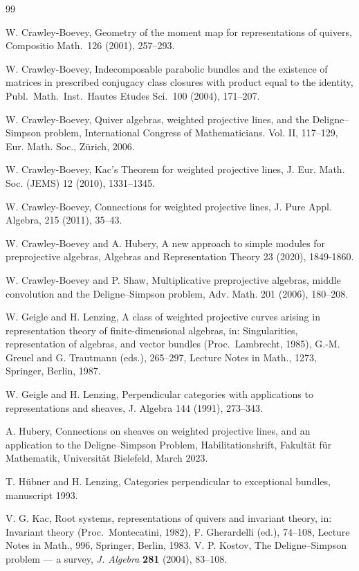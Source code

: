 \documentclass[12pt,a4paper]{amsart}
\theoremstyle{plain}
\begin{document}
\frenchspacing
\begin{thebibliography}{99}

W. Crawley-Boevey,
Geometry of the moment map for representations of quivers,
Compositio Math.\ 126 (2001), 257--293.

W. Crawley-Boevey,
Indecomposable parabolic bundles and the existence of matrices in
prescribed conjugacy class closures with product equal to the identity,
Publ.\ Math.\ Inst.\ Hautes Etudes Sci.\ 100 (2004), 171--207.

W. Crawley-Boevey,
Quiver algebras, weighted projective lines, and the Deligne--Simpson problem,
International Congress of Mathematicians. Vol. II, 
117--129, Eur. Math. Soc., Z\"{u}rich, 2006. 

W. Crawley-Boevey,
Kac's Theorem for weighted projective lines,
J. Eur. Math. Soc. (JEMS) 12 (2010), 1331--1345. 

W. Crawley-Boevey,
Connections for weighted projective lines,
J. Pure Appl. Algebra, 215 (2011), 35--43. 

W. Crawley-Boevey and A. Hubery, 
A new approach to simple modules for preprojective algebras, 
Algebras and Representation Theory 23 (2020), 1849-1860.

W. Crawley-Boevey and P. Shaw,
Multiplicative preprojective algebras, middle convolution and the Deligne--Simpson problem,
Adv. Math. 201 (2006), 180--208. 

W. Geigle and H. Lenzing,
A class of weighted projective curves arising in representation
theory of finite-dimensional algebras,
in:
Singularities, representation of algebras, and vector bundles
(Proc.\ Lambrecht, 1985),
G.-M. Greuel and G. Trautmann (eds.),
265--297, Lecture Notes in Math., 1273,
Springer, Berlin, 1987.

W. Geigle and H. Lenzing,
Perpendicular categories with applications to representations and sheaves,
J. Algebra 144 (1991), 273--343.

A. Hubery, 
Connections on sheaves on weighted projective lines, and an application to the Deligne--Simpson Problem, 
Habilitationshrift, Fakult\"at f\"ur Mathematik, Universit\"at Bielefeld, March 2023.

T. H\"ubner and H. Lenzing, 
Categories perpendicular to exceptional bundles, 
manuscript 1993.

V. G. Kac,
Root systems, representations of quivers and invariant theory,
in: Invariant theory
(Proc.\ Montecatini, 1982),
F. Gherardelli (ed.),
74--108, Lecture Notes in Math., 996,
Springer, Berlin, 1983.
%
V. P. Kostov, 
The Deligne--Simpson problem --- a survey,
\textit{J. Algebra} \textbf{281} (2004), 83--108.


\end{thebibliography}
\end{document}
